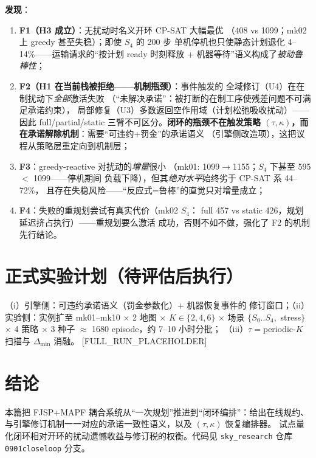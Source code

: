 \documentclass[UTF8,12pt,a4paper]{ctexart}
\begin{document}
\textbf{发现}：
\begin{enumerate}
  \item \textbf{F1（H3 成立）}：无扰动时名义开环 CP-SAT 大幅最优
    （408 vs 1099；mk02 上 greedy 甚至失稳）；即使 $S_4$ 的 200 步
    单机停机也只使静态计划退化 4--14\%——运输请求的``按计划 ready
    时刻释放 + 机器等待''语义构成了\emph{被动鲁棒性}；
  \item \textbf{F2（H1 在当前栈被拒绝——机制瓶颈）}：事件触发的
    全域修订（U4）在在制扰动下\emph{全部}激活失败
    （``未解决承诺''：被打断的在制工序使残差问题不可满足承诺约束），
    局部修复（U3）多数返回空作用域（计划松弛吸收扰动）——因此
    full/partial/static 三臂不可区分。\textbf{闭环的瓶颈不在触发策略
    $(\tau,\kappa)$，而在承诺解除机制}：需要``可违约+罚金''的承诺语义
    （引擎侧改造项），这把议程从策略层重定向到机制层；
  \item \textbf{F3}：greedy-reactive 对扰动的\emph{增量}很小
    （mk01: 1099$\to$1155；$S_4$ 下甚至 595 $<$ 1099——停机期间
    负载下降），但其\emph{绝对水平}始终劣于 CP-SAT 系 44--72\%，
    且存在失稳风险——``反应式=鲁棒''的直觉只对增量成立；
  \item \textbf{F4}：失败的重规划尝试有真实代价（mk02 $S_4$：
    full 457 vs static 426，规划延迟挤占执行）——重规划要么激活
    成功，否则不如不做，强化了 F2 的机制先行结论。
\end{enumerate}

\section{正式实验计划（待评估后执行）}

（i）引擎侧：可违约承诺语义（罚金参数化）+ 机器恢复事件的
修订窗口；（ii）实验侧：实例扩至 mk01--mk10 $\times$ 2 地图 $\times$
$K\in\{2,4,6\}$ $\times$ 场景 $\{S_0..S_4,$ stress$\}$ $\times$ 4 策略
$\times$ 3 种子 $\approx$ 1680 episode，约 7--10 小时分批；
（iii）$\tau=$periodic-$K$ 扫描与 $\Delta_{\min}$ 消融。
[FULL\_RUN\_PLACEHOLDER]

\section{结论}

本篇把 FJSP+MAPF 耦合系统从``一次规划''推进到``闭环编排''：给出在线规约、
与引擎修订机制一一对应的承诺一致性语义，以及 $(\tau,\kappa)$ 恢复编排器。
试点量化闭环相对开环的扰动遗憾收益与修订税的权衡。代码见
\texttt{sky\_research} 仓库 \texttt{0901closeloop} 分支。



\end{document}
